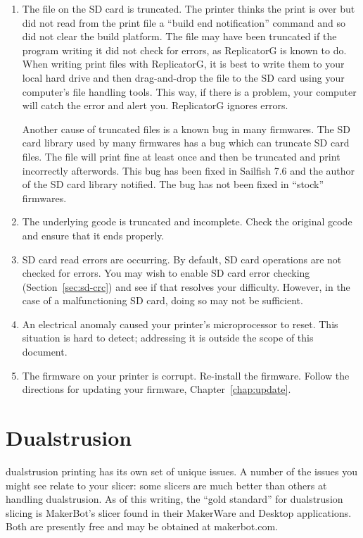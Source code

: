 \begin{enumerate}
\item The file on the SD card is truncated.  The printer thinks the print
  is over but did not read from the print file a ``build end notification''
  command and so did not clear the build platform.  The file may have
  been truncated if the program writing it did not check for errors, as
  ReplicatorG is known to do.  When writing print files with ReplicatorG,
  it is best to write them to your local hard drive and then drag-and-drop
  the file to the SD card using your computer's file handling tools.  This
  way, if there is a problem, your computer will catch the error and
  alert you.  ReplicatorG ignores errors.

  Another cause of truncated files is a known bug in many firmwares.
  The SD card library used by many firmwares has a bug which can truncate
  SD card files.  The file will print fine at least once and then be
  truncated and print incorrectly afterwords.  This bug has been fixed in
  Sailfish 7.6 and the author of the SD card library notified.  The bug has
  not been fixed in ``stock'' firmwares.
\item The underlying gcode is truncated and incomplete.  Check the original
  gcode and ensure that it ends properly.
\item SD card read errors are occurring.  By default, SD card operations
  are not checked for errors.  You may wish to enable SD card error checking (Section~\ref{sec:sd-crc})
  and see if that resolves your difficulty.  However, in the case of a malfunctioning 
  SD card, doing so may not be sufficient.
\item An electrical anomaly caused your printer's microprocessor to reset.
  This situation is hard to detect; addressing it is outside the scope of
  this document.
\item The firmware on your printer is corrupt.  Re-install the firmware.
  Follow the directions for updating your firmware, Chapter~\ref{chap:update}.
\end{enumerate}


\section{Dualstrusion}

\Gls{dualstrusion} printing has its own set of unique issues.  A
number of the issues you might see relate to your slicer: some slicers
are much better than others at handling dualstrusion.  As of this
writing, the ``gold standard'' for dualstrusion slicing is MakerBot's
slicer found in their MakerWare and Desktop applications.  Both are
presently free and may be obtained at makerbot.com.

